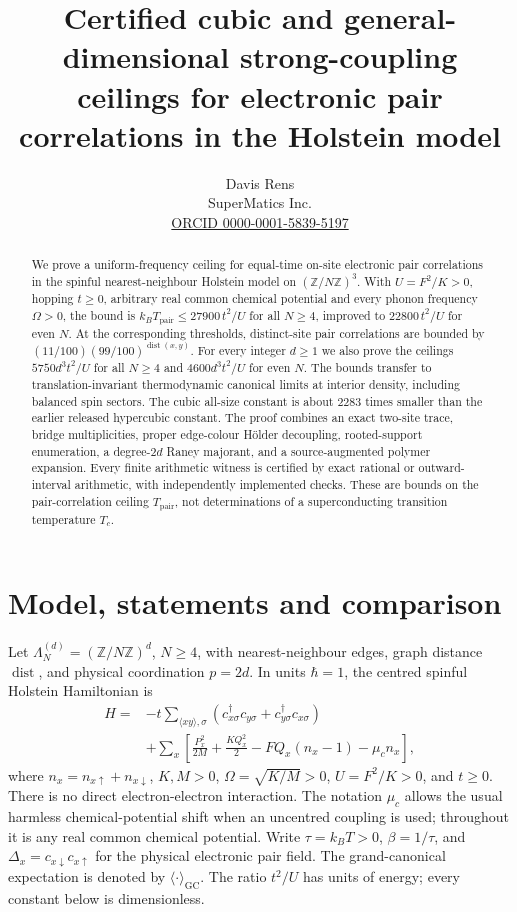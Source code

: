 \documentclass[11pt]{article}
\title{Certified cubic and general-dimensional strong-coupling ceilings\newline
for electronic pair correlations in the Holstein model}
\author{Davis Rens\\SuperMatics Inc.\\\href{https://orcid.org/0000-0001-5839-5197}{ORCID 0000-0001-5839-5197}}
\date{}
\theoremstyle{plain}
\theoremstyle{remark}
\DeclareMathOperator{\dist}{dist}
\newcommand{\GC}{\mathrm{GC}}
\begin{document}
\maketitle

\begin{abstract}
We prove a uniform-frequency ceiling for equal-time on-site electronic pair
correlations in the spinful nearest-neighbour Holstein model on
$(\mathbb Z/N\mathbb Z)^3$. With $U=F^2/K>0$, hopping $t\ge0$, arbitrary real
common chemical potential and every phonon frequency $\Omega>0$, the bound is
$k_B T_{\mathrm{pair}}\le27900\,t^2/U$ for all $N\ge4$, improved to
$22800\,t^2/U$ for even $N$. At the corresponding thresholds, distinct-site
pair correlations are bounded by $(11/100)(99/100)^{\dist(x,y)}$.
For every integer $d\ge1$ we also prove the ceilings
$5750d^3t^2/U$ for all $N\ge4$ and $4600d^3t^2/U$ for even $N$.
The bounds transfer to translation-invariant thermodynamic canonical limits at
interior density, including balanced spin sectors. The cubic all-size constant
is about $2283$ times smaller than the earlier released hypercubic constant.
The proof combines an exact two-site trace, bridge multiplicities, proper
edge-colour H\"older decoupling, rooted-support enumeration, a degree-$2d$
Raney majorant, and a source-augmented polymer expansion. Every finite
arithmetic witness is certified by exact rational or outward-interval
arithmetic, with independently implemented checks. These are bounds on the
pair-correlation ceiling $T_{\mathrm{pair}}$, not determinations of a
superconducting transition temperature $T_c$.
\end{abstract}

\section{Model, statements and comparison}\label{sec:model}

Let $\Lambda_N^{(d)}=(\mathbb Z/N\mathbb Z)^d$, $N\ge4$, with nearest-neighbour
edges, graph distance $\dist$, and physical coordination $p=2d$.
In units $\hbar=1$, the centred spinful Holstein Hamiltonian is
\begin{equation}\label{eq:hamiltonian}
\begin{split}
H={}&-t\sum_{\langle xy\rangle,\sigma}
(c_{x\sigma}^{\dagger}c_{y\sigma}+c_{y\sigma}^{\dagger}c_{x\sigma})\\
&+\sum_x\left[\frac{P_x^2}{2M}+\frac{KQ_x^2}{2}
-FQ_x(n_x-1)-\mu_c n_x\right],
\end{split}
\end{equation}
where $n_x=n_{x\uparrow}+n_{x\downarrow}$, $K,M>0$,
$\Omega=\sqrt{K/M}>0$, $U=F^2/K>0$, and $t\ge0$.
There is no direct electron-electron interaction. The notation $\mu_c$
allows the usual harmless chemical-potential shift when an uncentred
coupling is used; throughout it is any real common chemical potential.
Write $\tau=k_BT>0$, $\beta=1/\tau$, and
$\Delta_x=c_{x\downarrow}c_{x\uparrow}$ for the physical electronic pair field.
The grand-canonical expectation is denoted by $\langle\cdot\rangle_\GC$.
The ratio $t^2/U$ has units of energy; every constant below is dimensionless.
\end{document}
